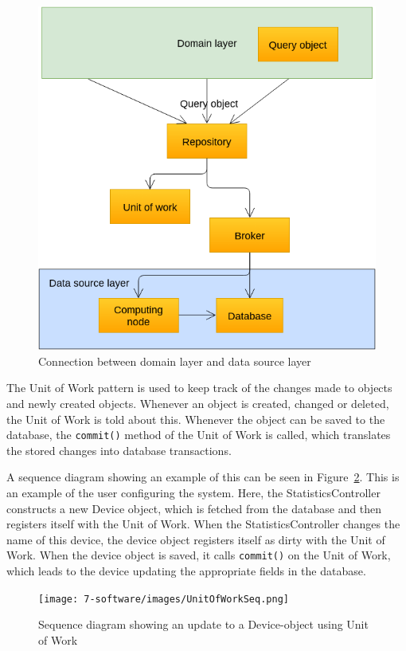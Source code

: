 \begin{figure}[H]
\centering
\includegraphics[width=0.8\linewidth]{7-software/images/RepoUowBroker.png}
\caption{Connection between domain layer and data source layer}
\label{fig:frontclasses}
\end{figure}

The Unit of Work pattern is used to keep track of the changes made to objects and newly created objects. Whenever an object is created, changed or deleted, the Unit of Work is told about this. 
Whenever the object can be saved to the database, the \verb|commit()| method of the Unit of Work is called, which translates the stored changes into database transactions.

A sequence diagram showing an example of this can be seen in Figure~\ref{fig:unitofworkseq}. 
This is an example of the user configuring the system. Here, the StatisticsController constructs a new Device object, which is fetched from the database and then registers itself with the Unit of Work. When the StatisticsController changes the name of this device, the device object registers itself as dirty with the Unit of Work. 
When the device object is saved, it calls \verb|commit()| on the Unit of Work, which leads to the device updating the appropriate fields in the database.

\begin{figure}[H]
\centering
\texttt{[image: 7-software/images/UnitOfWorkSeq.png]}
\caption{Sequence diagram showing an update to a Device-object using Unit of Work}
\label{fig:unitofworkseq}
\end{figure}

